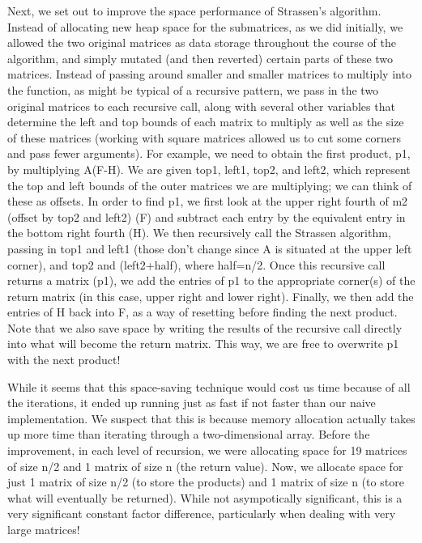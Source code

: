 \documentclass[12pt]{article}
\begin{document}
\noindent Next, we set out to improve the space performance of Strassen's algorithm. Instead of allocating new heap space for the submatrices, as we did initially, we allowed the two original matrices as data storage throughout the course of the algorithm, and simply mutated (and then reverted) certain parts of these two matrices. Instead of passing around smaller and smaller matrices to multiply into the function, as might be typical of a recursive pattern, we pass in the two original matrices to each recursive call, along with several other variables that determine the left and top bounds of each matrix to multiply as well as the size of these matrices (working with square matrices allowed us to cut some corners and pass fewer arguments). For example, we need to obtain the first product, p1, by multiplying A(F-H). We are given top1, left1, top2, and left2, which represent the top and left bounds of the outer matrices we are multiplying; we can think of these as offsets. In order to find p1, we first look at the upper right fourth of m2 (offset by top2 and left2) (F) and subtract each entry by the equivalent entry in the bottom right fourth (H). We then recursively call the Strassen algorithm, passing in top1 and left1 (those don't change since A is situated at the upper left corner), and top2 and (left2+half), where half=n/2. Once this recursive call returns a matrix (p1), we add the entries of p1 to the appropriate corner(s) of the return matrix (in this case, upper right and lower right). Finally, we then add the entries of H back into F, as a way of resetting before finding the next product. Note that we also save space by writing the results of the recursive call directly into what will become the return matrix. This way, we are free to overwrite p1 with the next product!
\bigskip

\noindent While it seems that this space-saving technique would cost us time because of all the iterations, it ended up running just as fast if not faster than our naive implementation. We suspect that this is because memory allocation actually takes up more time than iterating through a two-dimensional array. Before the improvement, in each level of recursion, we were allocating space for 19 matrices of size n/2 and 1 matrix of size n (the return value). Now, we allocate space for just 1 matrix of size n/2 (to store the products) and 1 matrix of size n (to store what will eventually be returned). While not asympotically significant, this is a very significant constant factor difference, particularly when dealing with very large matrices!
\end{document}
